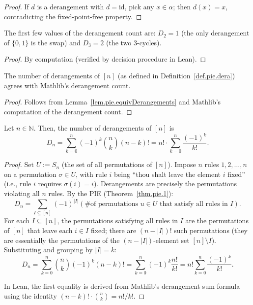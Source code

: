 \begin{proof}
\leanok
If $d$ is a derangement with $d = \mathrm{id}$, pick any $x \in \alpha$;
then $d(x) = x$, contradicting the fixed-point-free property.
\end{proof}

\begin{lemma}
\label{lem.pie.derangement-small-values}
\leanhelper
\leanok
The first few values of the derangement count are:
$D_2 = 1$ (the only derangement of $\{0,1\}$ is the swap) and
$D_3 = 2$ (the two $3$-cycles).
\end{lemma}

\begin{proof}
\leanok
By computation (verified by decision procedure in Lean).
\end{proof}

\begin{lemma}
\label{lem.pie.card_Derangement_eq}
\leanhelper
\leanok
The number of derangements of $[n]$ (as defined in
Definition~\ref{def.pie.dera}) agrees with Mathlib's derangement count.
\end{lemma}

\begin{proof}
\leanok
Follows from Lemma~\ref{lem.pie.equivDerangements} and
Mathlib's computation of the derangement count.
\end{proof}

\begin{theorem}
\label{thm.pie.count-der}
\leantarget
\leanok
Let $n \in \mathbb{N}$. Then, the number of derangements of $[n]$ is
\[
D_n = \sum_{k=0}^{n} (-1)^k \binom{n}{k} (n-k)!
= n! \cdot \sum_{k=0}^{n} \frac{(-1)^k}{k!}.
\]
\end{theorem}

\begin{proof}
Set $U := S_n$ (the set of all permutations of $[n]$). Impose $n$ rules
$1, 2, \ldots, n$ on a permutation $\sigma \in U$, with rule $i$ being
``thou shalt leave the element $i$ fixed'' (i.e., rule $i$ requires
$\sigma(i) = i$). Derangements are precisely the permutations violating all
$n$ rules. By the PIE (Theorem~\ref{thm.pie.1}):
\[
D_n = \sum_{I \subseteq [n]} (-1)^{|I|}
\left(\text{\# of permutations } u \in U \text{ that satisfy all rules in } I\right).
\]
For each $I \subseteq [n]$, the permutations satisfying all rules in $I$ are
the permutations of $[n]$ that leave each $i \in I$ fixed; there are
$(n - |I|)!$ such permutations (they are essentially the permutations of the
$(n - |I|)$-element set $[n] \setminus I$).
Substituting and grouping by $|I| = k$:
\[
D_n = \sum_{k=0}^{n} \binom{n}{k} (-1)^k (n-k)!
= \sum_{k=0}^{n} (-1)^k \frac{n!}{k!}
= n! \sum_{k=0}^{n} \frac{(-1)^k}{k!}.
\]

In Lean, the first equality is derived from Mathlib's derangement sum formula
using the identity $(n-k)! \cdot \binom{n}{k} = n!/k!$.
\end{proof}

